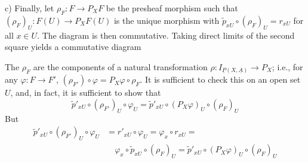 
c) Finally, let $\rho_F:F\longrightarrow P_XF$ be the presheaf morphism
such that $(\rho_F)_U:F(U)\longrightarrow P_XF(U)$ is the unique morphism with
$\tilde{p}_{xU}\circ(\rho_F)_U=r_{xU}$ for all $x\in U$. The diagram
is then commutative. Taking direct limits of the second square
yields a commutative diagram

The $\rho_F$ are the components of a natural transformation
$\rho:I_{\underline{P}(X,\underline{A})}\longrightarrow P_X$; i.e., for any $\varphi:F\longrightarrow F'$,
$(\rho_{F'})\circ\varphi=P_X\varphi\circ\rho_F$. It is sufficient to check this on an
open set $U$, and, in fact, it is sufficient to show that
\[
\tilde{p}'_{xU}\circ(\rho_{F'})_U\circ\varphi_U
=\tilde{p}'_{xU}\circ(P_X\varphi)_U\circ(\rho_F)_U
\]
But
\[
\begin{aligned}
\tilde{p}'_{xU}\circ(\rho_{F'})_U\circ\varphi_U
&=r'_{xU}\circ\varphi_U=\varphi_x\circ r_{xU}=\\
&\quad\varphi_x\circ\tilde{p}_{xU}\circ(\rho_F)_U
=\tilde{p}'_{xU}\circ(P_X\varphi)_U\circ(\rho_F)_U
\end{aligned}
\]
